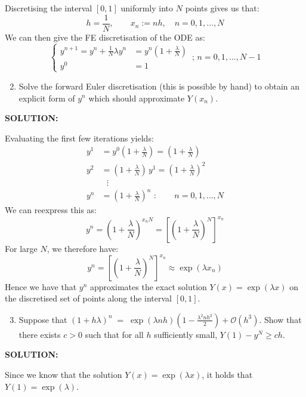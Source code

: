 \documentclass[]{article}
\begin{document}
\noindent Discretising the interval $[0,1]$ uniformly into $N$ points gives us that:
\[
h = \frac{1}{N}, \qquad x_n := n h,\quad n=0,1,\dots,N
\]
\noindent We can then give the FE discretisation of the ODE as:
\[
\begin{cases}
    y^{n+1} = y^{n} + \frac{1}{N}\lambda y^{n}  &=y^{n} \left(1+ \frac{\lambda}{N} \right) \\
    y^0 &= 1
    \end{cases} \,;\,  n = 0,1,\dots,N-1
\]
\begin{enumerate}
\setcounter{enumi}{1}
\item Solve the forward Euler discretisation (this is possible by hand) to obtain an explicit form of $y^n$ which should approximate $Y(x_n)$.
\end{enumerate}

\noindent\textbf{SOLUTION:}\newline

\noindent Evaluating the first few iterations yields:
\[
\begin{aligned}
y^1 &= y^0(1+ \frac{\lambda}{N} ) = (1+ \frac{\lambda}{N} )\\
y^2 &= (1+ \frac{\lambda}{N})\,y^1 = (1+\frac{\lambda}{N})^2\,\\
&\,\,\,\,\vdots\\
y^n &= (1+ \frac{\lambda}{N})^n\,\,:\qquad n=0,1,\dots,N
\end{aligned}
\]
\noindent We can reexpress this as:
\[
y^n = (1+ \frac{\lambda}{N})^{x_nN} = \left[\left(1+\frac{\lambda}{N}\right)^{N}\right]^{x_n}  
\]
\noindent For large $N$, we therefore have:
\[
y^n = \left[\left(1+\frac{\lambda}{N}\right)^{N}\right]^{x_n}   \approx \exp({\lambda x_n}) 
\]
\noindent Hence we have that $y^n$ approximates the exact solution  $Y(x)=\exp({\lambda x})$ on the discretised set of points along the interval $[0,1]$.

\begin{enumerate}
\setcounter{enumi}{2}
\item Suppose that
$
(1+h\lambda)^n \;=\; \exp(\lambda n h)\left(1-\frac{\lambda^2 n h^2}{2}\right)+\mathcal{O}(h^3).
$ Show that there exists $c>0$ such that for all $h$ sufficiently small,
$
Y(1)-y^N \geq ch.$\newline

\end{enumerate}

\noindent\textbf{SOLUTION:}\newline

\noindent Since we know that the solution $Y(x)=\exp(\lambda x)$, it holds that $Y(1) = \exp({\lambda})$.\newline
\end{document}
